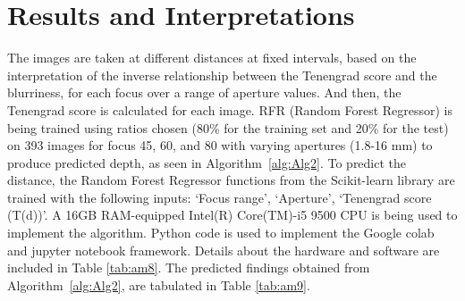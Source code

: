 \documentclass[sn-mathphys]{sn-jnl}%
\theoremstyle{thmstyleone}%
\theoremstyle{thmstyletwo}%
\theoremstyle{thmstylethree}%
\begin{document}
\section{Results and  Interpretations}
The images are taken at different distances at fixed intervals, based on the interpretation of the inverse relationship between the Tenengrad score and the blurriness, for each focus over a range of aperture values. And then, the Tenengrad score is calculated for each image.  RFR (Random Forest Regressor) is being trained using ratios chosen (80\% for the training set and 20\% for the test) on 393 images for focus 45, 60, and 80 with varying apertures (1.8-16 mm) to produce predicted depth, as seen in Algorithm~\ref{alg:Alg2}. To predict the distance, the Random Forest Regressor functions from the Scikit-learn library are trained with the following inputs: \lq Focus range\rq, \lq Aperture\rq, \lq Tenengrad score (T(d))\rq \hspace{.1cm}. A 16GB RAM-equipped Intel(R) Core(TM)-i5 9500 CPU is being used to implement the algorithm. Python code is used to implement the Google colab and jupyter notebook framework. Details about the hardware and software are included in Table \ref{tab:am8}.
The predicted findings obtained from  Algorithm~\ref{alg:Alg2}, are tabulated in Table \ref{tab:am9}.
\pagebreak
\end{document}
